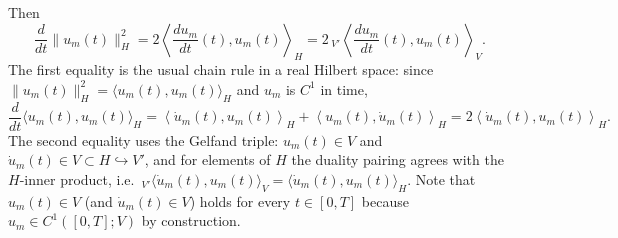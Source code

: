 \documentclass[11pt]{article}
\theoremstyle{definition}
\theoremstyle{remark}
\begin{document}
Then
\[
\frac{d}{dt}\|u_m(t)\|_H^2
=
2\left\langle \frac{du_m}{dt}(t),u_m(t)\right\rangle_H
=
2\,{}_{V'}\left\langle \frac{du_m}{dt}(t),u_m(t)\right\rangle_{V}.
\]
\noindent
The first equality is the usual chain rule in a real Hilbert space: since $\|u_m(t)\|_H^2=\langle u_m(t),u_m(t)\rangle_H$ and $u_m$ is $C^1$ in time,
\[
\frac{d}{dt}\langle u_m(t),u_m(t)\rangle_H
=
\left\langle \dot u_m(t),u_m(t)\right\rangle_H
+
\left\langle u_m(t),\dot u_m(t)\right\rangle_H
=
2\left\langle \dot u_m(t),u_m(t)\right\rangle_H.
\]
The second equality uses the Gelfand triple: $u_m(t)\in V$ and $\dot u_m(t)\in V\subset H\hookrightarrow V'$, and for elements of $H$ the duality pairing agrees with the $H$-inner product, i.e.\ ${}_{V'}\langle \dot u_m(t),u_m(t)\rangle_V=\langle \dot u_m(t),u_m(t)\rangle_H$.
\noindent
Note that $u_m(t)\in V$ (and $\dot u_m(t)\in V$) holds for every $t\in[0,T]$ because $u_m\in C^1([0,T];V)$ by construction.
\end{document}
